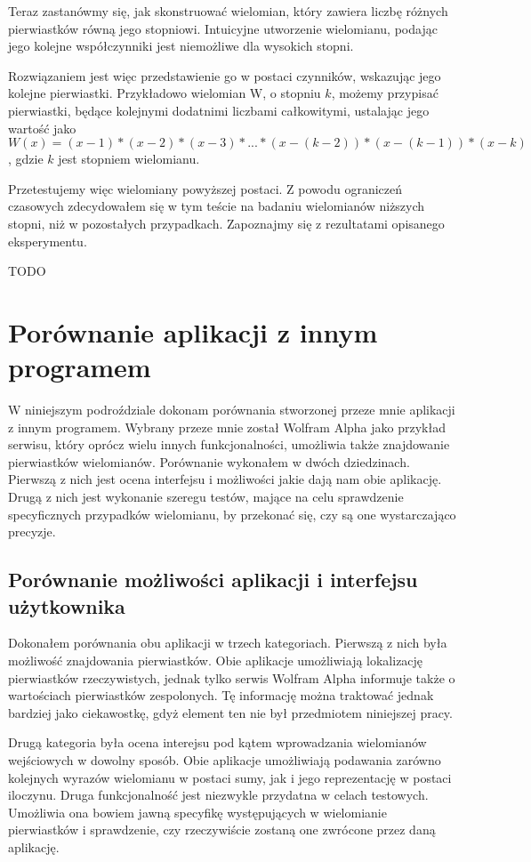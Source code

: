 \documentclass[oneside,a4paper]{book}
\begin{document}
	Teraz zastanówmy się, jak skonstruować wielomian, który zawiera liczbę różnych pierwiastków równą jego stopniowi. Intuicyjne utworzenie wielomianu, podając jego kolejne współczynniki jest niemożliwe dla wysokich stopni.
	
	Rozwiązaniem jest więc przedstawienie go w postaci czynników, wskazując jego kolejne pierwiastki. Przykładowo wielomian W, o stopniu $k$, możemy przypisać pierwiastki, będące kolejnymi dodatnimi liczbami całkowitymi, ustalając jego wartość jako $W(x)=(x-1)*(x-2)*(x-3)*...*(x-(k-2))*(x-(k-1))*(x-k)$, gdzie $k$ jest stopniem wielomianu.
	
	Przetestujemy więc wielomiany powyższej postaci. Z powodu ograniczeń czasowych zdecydowałem się w tym teście na badaniu wielomianów niższych stopni, niż w pozostałych przypadkach. Zapoznajmy się z rezultatami opisanego eksperymentu.
	
	TODO
	
	\section {Porównanie aplikacji z innym programem}
	
	W niniejszym podroździale dokonam porównania stworzonej przeze mnie aplikacji z innym programem. Wybrany przeze mnie został Wolfram Alpha jako przykład serwisu, który oprócz wielu innych funkcjonalności, umożliwia także znajdowanie pierwiastków wielomianów. Porównanie wykonałem w dwóch dziedzinach. Pierwszą z nich jest ocena interfejsu i możliwości jakie dają nam obie aplikację. Drugą z nich jest wykonanie szeregu testów, mające na celu sprawdzenie specyficznych przypadków wielomianu, by przekonać się, czy są one wystarczająco precyzje.
	
	\subsection {Porównanie możliwości aplikacji i interfejsu użytkownika}
	
	Dokonałem porównania obu aplikacji w trzech kategoriach. Pierwszą z nich była możliwość znajdowania pierwiastków. Obie aplikacje umożliwiają lokalizację pierwiastków rzeczywistych, jednak tylko serwis Wolfram Alpha informuje także o wartościach pierwiastków zespolonych. Tę informację można traktować jednak bardziej jako ciekawostkę, gdyż element ten nie był przedmiotem niniejszej pracy.
	
	Drugą kategoria była ocena interejsu pod kątem wprowadzania wielomianów wejściowych w dowolny sposób. Obie aplikacje umożliwiają podawania zarówno kolejnych wyrazów wielomianu w postaci sumy, jak i jego reprezentację w postaci iloczynu. Druga funkcjonalność jest niezwykle przydatna w celach testowych. Umożliwia ona bowiem jawną specyfikę występujących w wielomianie pierwiastków i sprawdzenie, czy rzeczywiście zostaną one zwrócone przez daną aplikację.
	
\end{document}
